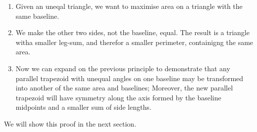 \documentclass[a4paper]{book}
\numberwithin{theorem}{section}%
\begin{document}
\begin{enumerate}
    \item Given an uneqal triangle, we want to maximise area on a triangle with the same baseline. 

    \item We make the other two sides, not the baseline, equal. The result is a triangle witha smaller leg-sum, and therefor a smaller perimeter, containigng the same area.

    \item Now we can expand on the previous principle to demonstrate that any parallel trapezoid with unequal angles on one baseline may be transformed into another of the same area and baselines; Moreover, the new parallel trapezoid will have symmetry along the axis formed by the baseline midpoints and a smaller sum of side lengths. 
\end{enumerate}

We will show this proof in the next section.
\newline
\newline
\end{document}
